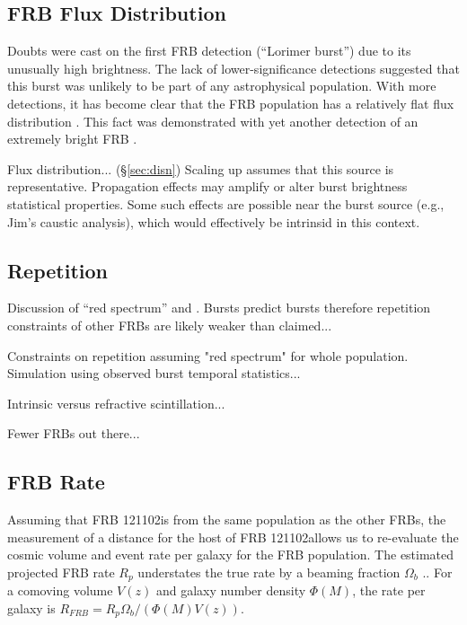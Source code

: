 \documentclass[twocolumn]{aastex61}
\newcommand{\frb}{FRB 121102}
\begin{document}
\subsection{FRB Flux Distribution}
Doubts were cast on the first FRB detection (``Lorimer burst'') due to its unusually high brightness. The lack of lower-significance detections suggested that this burst was unlikely to be part of any astrophysical population. With more detections, it has become clear that the FRB population has a relatively flat flux distribution \citep{2016ApJ...830...75V, 2016arXiv160206099L, 2016arXiv161100458L}. This fact was demonstrated with yet another detection of an extremely bright FRB \citep{2016arXiv161105758R}.


Flux distribution... (\S \ref{sec:disn})
Scaling up assumes that this source is representative. Propagation effects may amplify or alter burst brightness statistical properties. Some such effects are possible near the burst source (e.g., Jim's caustic analysis), which would effectively be intrinsid in this context.

\subsection{Repetition}
Discussion of ``red spectrum'' and \citet{2016MNRAS.458L..89C}. Bursts predict bursts therefore repetition constraints of other FRBs are likely weaker than claimed...

Constraints on repetition assuming "red spectrum" for whole population. Simulation using observed burst temporal statistics...

Intrinsic versus refractive scintillation...

Fewer FRBs out there...


\subsection{FRB Rate}
Assuming that \frb is from the same population as the other FRBs, the measurement of a distance for the host of \frb allows us to re-evaluate the cosmic volume and event rate per galaxy for the FRB population. The estimated projected FRB rate $R_p$ understates the true rate by a beaming fraction $\Omega_b$ \citep[$\sim$10\%;][]{1998MNRAS.298..625T}.. For a comoving volume $V(z)$ and galaxy number density $\Phi(M)$, the rate per galaxy is $R_{FRB} = R_p \Omega_b /(\Phi(M)V (z))$. 
\end{document}
